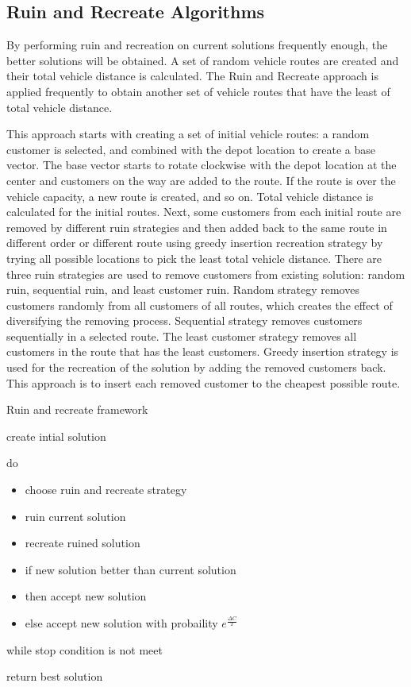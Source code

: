 \documentclass[../main.tex]{}
\begin{document}
\subsection{Ruin and Recreate Algorithms}

By performing ruin and recreation on current solutions frequently enough, the better solutions will be obtained. A set of random vehicle routes are created and their total vehicle distance is calculated. The Ruin and Recreate approach is applied frequently to obtain another set of vehicle routes that have the least of total vehicle distance.

This approach starts with creating a set of initial vehicle routes: a random customer is selected, and combined with the depot location to create a base vector. The base vector starts to rotate clockwise with the depot location at the center and customers on the way are added to the route. If the route is over the vehicle capacity, a new route is created, and so on. Total vehicle distance is calculated for the initial routes.
Next, some customers from each initial route are removed by different ruin strategies and then added back to the same route in different order or different route using greedy insertion recreation strategy by trying all possible locations to pick the least total vehicle distance.
 There are three ruin strategies are used to remove customers from existing solution: random ruin, sequential ruin, and least customer ruin. Random strategy removes customers randomly from all customers of all routes, which creates the effect of diversifying the removing process. Sequential strategy removes customers sequentially in a selected route. The least customer strategy removes all customers in the route that has the least customers.
Greedy insertion strategy is used for the recreation of the solution by adding the removed customers back. This approach is to insert each removed customer to the cheapest possible route.

\begin{algorithm}
\caption{Ruin and recreate framework}\label{alg:RR}
\flushleft
\begin{itemize}
\item create intial solution
\item do {
\flushleft
\begin{itemize}
\item choose ruin and recreate strategy
\item ruin current solution
\item recreate ruined solution
\item if new solution better than current solution
\item then accept new solution
\item else accept new solution with probaility $e^{\frac{\Delta C}{T}}$
\end{itemize}
\item } while stop condition is not meet
\item return best solution
\end{itemize}
\end{algorithm}
\end{document}
